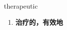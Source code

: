 
\begin{frame}
{\huge therapeutic}
\begin{center}
\begin{enumerate}\Large
  \item \textbf{治疗的，有效地}
\end{enumerate}
\end{center}
\end{frame}
